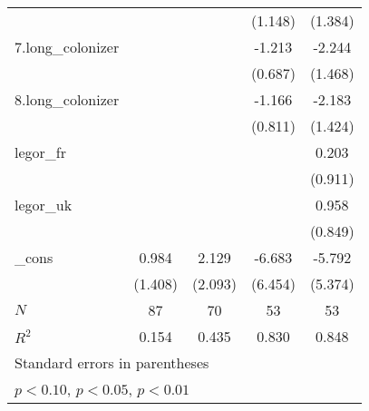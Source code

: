 {\begin{tabular}{l*{4}{c}}
            &                     &                     &     (1.148)         &     (1.384)         \\
[1em]
7.long\_colonizer&                     &                     &      -1.213         &      -2.244         \\
            &                     &                     &     (0.687)         &     (1.468)         \\
[1em]
8.long\_colonizer&                     &                     &      -1.166         &      -2.183         \\
            &                     &                     &     (0.811)         &     (1.424)         \\
[1em]
legor\_fr    &                     &                     &                     &       0.203         \\
            &                     &                     &                     &     (0.911)         \\
[1em]
legor\_uk    &                     &                     &                     &       0.958         \\
            &                     &                     &                     &     (0.849)         \\
[1em]
\_cons      &       0.984         &       2.129         &      -6.683         &      -5.792         \\
            &     (1.408)         &     (2.093)         &     (6.454)         &     (5.374)         \\
\hline
\(N\)       &          87         &          70         &          53         &          53         \\
\(R^{2}\)   &       0.154         &       0.435         &       0.830         &       0.848         \\
\hline\hline
\multicolumn{5}{l}{\footnotesize Standard errors in parentheses}\\
\multicolumn{5}{l}{\footnotesize \sym{*} \(p<0.10\), \sym{**} \(p<0.05\), \sym{***} \(p<0.01\)}\\
\end{tabular}
}
